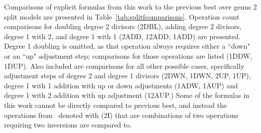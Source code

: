 Comparisons of explicit formulas from this work to the previous best over genus
2 split models are presented in Table~\ref{tab:splitfcomparisons}. Operation
count comparisons for doubling degree 2 divisors (2DBL), adding degree 2
divisors, degree 1 with 2, and degree 1 with 1 (2ADD, 12ADD, 1ADD) are
presented. Degree 1 doubling is omitted, as that operation always requires
either a ``down" or an ``up" adjustment step; comparisons for those operations
are listed (1DDW, 1DUP). Also included are comparisons for all other possible
cases, specifically adjustment steps of degree 2 and degree 1 divisors (2DWN,
1DWN, 2UP, 1UP), degree 1 with 1 addition with up or down adjustments (1ADW,
1AUP) and degree 1 with 2 addition with up adjustment (12AUP.) Some of the
formulas in this work cannot be directly compared to previous best, and instead
the operations from~\cite{EricksonJacobsonStein_realg2_2011} denoted with (2I)
that are combinations of two operations requiring two inversions are compared
to.

